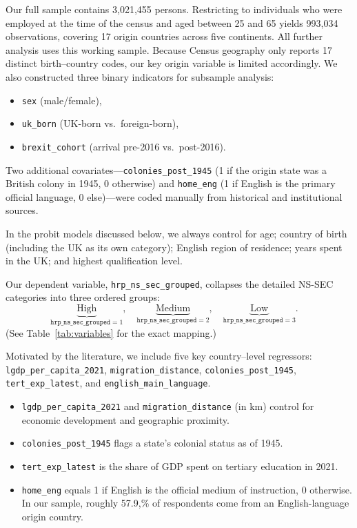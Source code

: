 \documentclass[12pt, a4paper]{article}
\begin{document}
Our full sample contains 3{,}021{,}455 persons.  Restricting to individuals who were employed at the time of the census and aged between 25 and 65 yields 993{,}034 observations, covering 17 origin countries across five continents.  All further analysis uses this working sample.  Because Census geography only reports 17 distinct birth–country codes, our key origin variable is limited accordingly.  We also constructed three binary indicators for subsample analysis: 
\begin{itemize}
  \item \texttt{sex} (male/female),
  \item \texttt{uk\_born} (UK-born vs.\ foreign-born),
  \item \texttt{brexit\_cohort} (arrival pre-2016 vs.\ post-2016).
\end{itemize}

Two additional covariates—\texttt{colonies\_post\_1945} (1 if the origin state was a British colony in 1945, 0 otherwise) and \texttt{home\_eng} (1 if English is the primary official language, 0 else)—were coded manually from historical and institutional sources.

In the probit models discussed below, we always control for age; country of birth (including the UK as its own category); English region of residence; years spent in the UK; and highest qualification level.

Our dependent variable, \texttt{hrp\_ns\_sec\_grouped}, collapses the detailed NS-SEC categories into three ordered groups:
\[
  \underbrace{\text{High}}_{\texttt{hrp\_ns\_sec\_grouped}=1},\quad
  \underbrace{\text{Medium}}_{\texttt{hrp\_ns\_sec\_grouped}=2},\quad
  \underbrace{\text{Low}}_{\texttt{hrp\_ns\_sec\_grouped}=3}. \quad
\]
(See Table~\ref{tab:variables} for the exact mapping.)

Motivated by the literature, we include five key country–level regressors:
\texttt{lgdp\_per\_capita\_2021}, \texttt{migration\_distance}, \texttt{colonies\_post\_1945}, \texttt{tert\_exp\_latest}, and \texttt{english\_main\_language}.  
\begin{itemize}
  \item \texttt{lgdp\_per\_capita\_2021} and \texttt{migration\_distance} (in km) control for economic development and geographic proximity.  
  \item \texttt{colonies\_post\_1945} flags a state’s colonial status as of 1945.  
  \item \texttt{tert\_exp\_latest} is the share of GDP spent on tertiary education in 2021.  
  \item \texttt{home\_eng} equals 1 if English is the official medium of instruction, 0 otherwise.  In our sample, roughly 57.9,\% of respondents come from an English-language origin country.  
\end{itemize}
\end{document}
